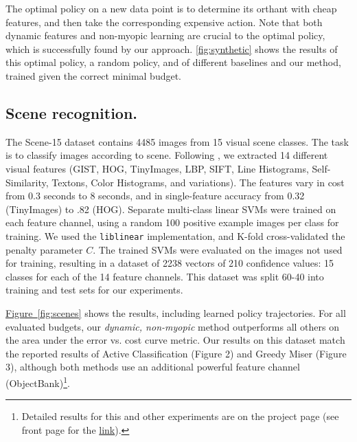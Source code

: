 The optimal policy on a new data point is to determine its orthant with cheap features, and then take the corresponding expensive action.
Note that both dynamic features and non-myopic learning are crucial to the optimal policy, which is successfully found by our approach.
\autoref{fig:synthetic} shows the results of this optimal policy, a random policy, and of different baselines and our method, trained given the correct minimal budget.

\subsection{Scene recognition.}
The Scene-15 dataset \parencite{Lazebnik-CVPR-2006} contains 4485 images from 15 visual scene classes.
The task is to classify images according to scene.
Following \parencite{Xiao-CVPR-2010}, we extracted 14 different visual features (GIST, HOG, TinyImages, LBP, SIFT, Line Histograms, Self-Similarity, Textons, Color Histograms, and variations).
The features vary in cost from 0.3 seconds to 8 seconds, and in single-feature accuracy from 0.32 (TinyImages) to .82 (HOG).
Separate multi-class linear SVMs were trained on each feature channel, using a random 100 positive example images per class for training.
We used the \texttt{liblinear} implementation, and K-fold cross-validated the penalty parameter $C$.
The trained SVMs were evaluated on the images not used for training, resulting in a dataset of 2238 vectors of 210 confidence values: 15 classes for each of the 14 feature channels.
This dataset was split 60-40 into training and test sets for our experiments.

\hyperref[fig:scenes]{Figure~\ref*{fig:scenes}} shows the results, including learned policy trajectories.
For all evaluated budgets, our \emph{dynamic, non-myopic} method outperforms all others on the area under the error vs. cost curve metric.
Our results on this dataset match the reported results of Active Classification \parencite{Gao-NIPS-2011} (Figure 2) and Greedy Miser \parencite{Xu-ICML-2012} (Figure 3), although both methods use an additional powerful feature channel (ObjectBank)\footnote{Detailed results for this and other experiments are on the project page (see front page for the \href{http://sergeykarayev.com/recognition-on-a-budget/}{link}).}.


